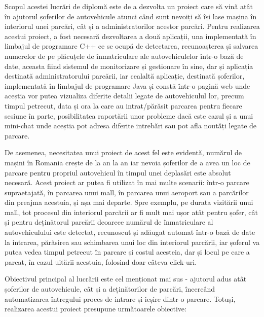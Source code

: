\documentclass[12pt]{article}
\begin{document}
Scopul acestei lucr\u{a}ri de diplom\u{a} este de a dezvolta un proiect care s\u{a} vin\u{a} at\^{a}t \^{i}n ajutorul șoferilor de autovehicule atunci c\^{a}nd sunt nevoiți s\u{a} \^{i}și lase mașina \^{i}n interiorul unei parc\u{a}ri, c\^{a}t și a administratorilor acestor parc\u{a}ri. Pentru realizarea acestui proiect, a fost necesar\u{a} dezvoltarea a dou\u{a} aplicații, una implementat\u{a} \^{i}n limbajul de programare C++ ce se ocup\u{a} de detectarea, recunoașterea și salvarea numerelor de pe pl\u{a}cuțele de \^{i}nmatriculare ale autovehiculelor \^{i}ntr-o baz\u{a} de date, aceasta fiind sistemul de monitorizare și gestionare \^{i}n sine, dar și aplicația destinat\u{a} administratorului parc\u{a}rii, iar cealalt\u{a} aplicație, destinat\u{a} șoferilor, implementat\u{a} \^{i}n limbajul de programare Java și const\u{a} \^{i}ntr-o pagin\u{a} web unde aceștia vor putea vizualiza diferite detalii legate de autovehiculul lor, precum timpul petrecut, data și ora la care au intrat/p\u{a}r\u{a}sit parcarea pentru fiecare sesiune \^{i}n parte, posibilitatea raport\u{a}rii unor probleme dac\u{a} este cazul și a unui mini-chat unde aceștia pot adresa diferite intreb\u{a}ri sau pot afla nout\u{a}ți legate de parcare.

De asemenea, necesitatea unui proiect de acest fel este evident\u{a}, num\u{a}rul de mașini \^{i}n Romania crește de la an la an iar nevoia șoferilor de a avea un loc de parcare pentru propriul autovehicul \^{i}n timpul unei deplas\u{a}ri este absolut necesar\u{a}. Acest proiect ar putea fi utilizat \^{i}n mai multe scenarii: \^{i}ntr-o parcare supraetajat\u{a}, \^{i}n parcarea unui mall, \^{i}n parcarea unui aeroport sau a parc\u{a}rilor din preajma acestuia, și așa mai departe. Spre exemplu, pe durata vizit\u{a}rii unui mall, tot procesul din interiorul parc\u{a}rii ar fi mult mai ușor at\^{a}t pentru șofer, c\^{a}t și pentru dețin\u{a}torul parc\u{a}rii deoarece num\u{a}rul de \^{i}nmatriculare al autovehiculului este detectat, recunoscut și ad\u{a}ugat automat \^{i}ntr-o baz\u{a} de date la intrarea, p\u{a}r\u{a}sirea sau schimbarea unui loc din interiorul parc\u{a}rii, iar șoferul va putea vedea timpul petrecut \^{i}n parcare și costul acesteia, dar și locul pe care a parcat, \^{i}n cazul uit\u{a}rii acestuia, folosind doar c\^{a}teva click-uri.

Obiectivul principal al lucr\u{a}rii este cel menționat mai sus - ajutorul adus at\^{a}t șoferilor de autovehicule, c\^{a}t și a dețin\u{a}torilor de parc\u{a}ri, \^{i}ncerc\^{a}nd automatizarea \^{i}ntregului proces de intrare și ieșire dintr-o parcare. Totuși, realizarea acestui proiect presupune urm\u{a}toarele obiective:
\end{document}
